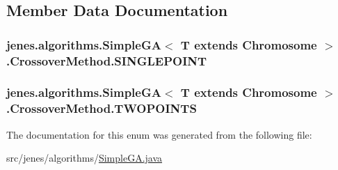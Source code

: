 \subsection{Member Data Documentation}
\hypertarget{enumjenes_1_1algorithms_1_1_simple_g_a_3_01_t_01extends_01_chromosome_01_4_1_1_crossover_method_a0dba044ab40298639e47034fda066ece}{
\subsubsection[{S\-I\-N\-G\-L\-E\-P\-O\-I\-N\-T}]{\setlength{\rightskip}{0pt plus 5cm}jenes.\-algorithms.\-Simple\-G\-A$<$ T extends Chromosome $>$.Crossover\-Method.\-S\-I\-N\-G\-L\-E\-P\-O\-I\-N\-T}}\label{enumjenes_1_1algorithms_1_1_simple_g_a_3_01_t_01extends_01_chromosome_01_4_1_1_crossover_method_a0dba044ab40298639e47034fda066ece}
\hypertarget{enumjenes_1_1algorithms_1_1_simple_g_a_3_01_t_01extends_01_chromosome_01_4_1_1_crossover_method_ad25c14da6b790cbaeac60e7b0a619144}{
\subsubsection[{T\-W\-O\-P\-O\-I\-N\-T\-S}]{\setlength{\rightskip}{0pt plus 5cm}jenes.\-algorithms.\-Simple\-G\-A$<$ T extends Chromosome $>$.Crossover\-Method.\-T\-W\-O\-P\-O\-I\-N\-T\-S}}\label{enumjenes_1_1algorithms_1_1_simple_g_a_3_01_t_01extends_01_chromosome_01_4_1_1_crossover_method_ad25c14da6b790cbaeac60e7b0a619144}


The documentation for this enum was generated from the following file\-:\begin{DoxyCompactItemize}
\item 
src/jenes/algorithms/\hyperlink{_simple_g_a_8java}{Simple\-G\-A.\-java}\end{DoxyCompactItemize}
